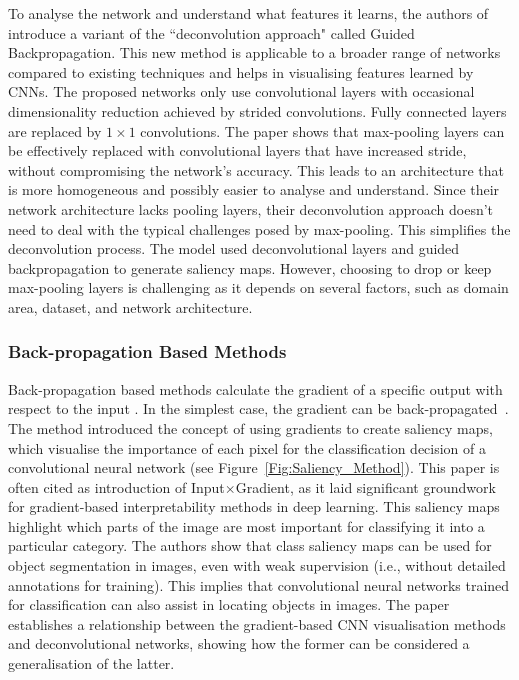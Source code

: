To analyse the network and understand what features it learns, the authors of~\cite{SpringenbergDBR14} introduce a variant of the ``deconvolution approach" called Guided Backpropagation. This new method is applicable to a broader range of networks compared to existing techniques and helps in visualising features learned by CNNs. The proposed networks only use convolutional layers with occasional dimensionality reduction achieved by strided convolutions. Fully connected layers are replaced by $1\times 1$ convolutions. The paper shows that max-pooling layers can be effectively replaced with convolutional layers that have increased stride, without compromising the network's accuracy. This leads to an architecture that is more homogeneous and possibly easier to analyse and understand. Since their network architecture lacks pooling layers, their deconvolution approach doesn't need to deal with the typical challenges posed by max-pooling. This simplifies the deconvolution process. The model used deconvolutional layers and guided backpropagation to generate saliency maps. However, choosing to drop or keep max-pooling layers is challenging as it depends on several factors, such as domain area, dataset, and network architecture. 

\subsubsection{Back-propagation Based Methods}
\label{sec:backprop}

Back-propagation based methods calculate the gradient of a specific output with respect to the input . In the simplest case, the gradient can be back-propagated~\cite{SimonyanVZ13}. The method introduced the concept of using gradients to create saliency maps, which visualise the importance of each pixel for the classification decision of a convolutional neural network (see Figure~\ref{Fig:Saliency_Method}). This paper is often cited as introduction of Input$\times$Gradient, as it laid significant groundwork for gradient-based interpretability methods in deep learning. This saliency maps highlight which parts of the image are most important for classifying it into a particular category. The authors show that class saliency maps can be used for object segmentation in images, even with weak supervision (i.e., without detailed annotations for training). This implies that convolutional neural networks trained for classification can also assist in locating objects in images. The paper establishes a relationship between the gradient-based CNN visualisation methods and deconvolutional networks, showing how the former can be considered a generalisation of the latter.

